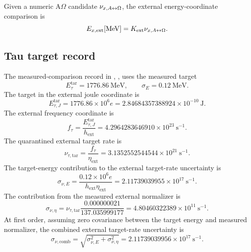 Given a numeric A\(\Omega\) candidate \(\nu_{x,A{\leftrightarrow}\Omega}\), the external energy-coordinate comparison is
\[
E_{x,\mathrm{ext}}[\mathrm{MeV}]
=
K_{\mathrm{ext}}\nu_{x,A{\leftrightarrow}\Omega}.
\]

\subsection{Tau target record}\label{manual:external-comparison:tau-target-normalization}
The measured-comparison record in , , uses the measured target
\[
E_\tau^{\mathrm{tar}}=1776.86\ \mathrm{MeV},
\qquad
\sigma_E=0.12\ \mathrm{MeV}.
\]
The target in the external joule coordinate is
\[
E_{\tau,J}^{\mathrm{tar}}
=
1776.86\times10^6 e
=
2.84684357388924\times10^{-10}\ \mathrm J.
\]
The external frequency coordinate is
\[
f_\tau
=
\frac{E_{\tau,J}^{\mathrm{tar}}}{h_{\mathrm{ext}}}
=
4.2964283646910\times10^{23}\ \mathrm{s}^{-1}.
\]
The quarantined external target rate is
\[
\nu_{\tau,\mathrm{tar}}
=
\frac{f_\tau}{\eta_{\mathrm{ext}}}
=
3.1352552544544\times10^{21}\ \mathrm{s}^{-1}.
\]
The target-energy contribution to the external target-rate uncertainty is
\[
\sigma_{\nu,E}
=
\frac{0.12\times10^6e}{h_{\mathrm{ext}}\eta_{\mathrm{ext}}}
=
2.11739039955\times10^{17}\ \mathrm{s}^{-1}.
\]
The contribution from the measured external normalizer is
\[
\sigma_{\nu,\eta}
=
\nu_{\tau,\mathrm{tar}}
\frac{0.000000021}{137.035999177}
=
4.80460322389\times10^{11}\ \mathrm{s}^{-1}.
\]
At first order, assuming zero covariance between the target energy and
measured normalizer, the combined external target-rate uncertainty is
\[
\sigma_{\nu,\mathrm{comb}}
=
\sqrt{\sigma_{\nu,E}^2+\sigma_{\nu,\eta}^2}
=
2.11739039956\times10^{17}\ \mathrm{s}^{-1}.
\]

